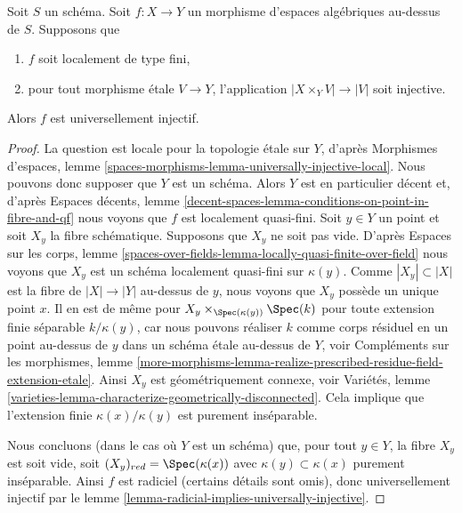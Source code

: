 \begin{lemma}
\label{lemma-check-universally-injective}
Soit $S$ un schéma. Soit $f : X \to Y$ un morphisme d'espaces algébriques
au-dessus de $S$. Supposons que
\begin{enumerate}
\item $f$ soit localement de type fini,
\item pour tout morphisme \'etale $V \to Y$, l'application $|X \times_Y V| \to |V|$
soit injective.
\end{enumerate}
Alors $f$ est universellement injectif.
\end{lemma}

\begin{proof}
La question est locale pour la topologie \'etale sur $Y$, d'après
Morphismes d'espaces, lemme
\ref{spaces-morphisms-lemma-universally-injective-local}.
Nous pouvons donc supposer que $Y$ est un schéma.
Alors $Y$ est en particulier décent et, d'après Espaces décents, lemme
\ref{decent-spaces-lemma-conditions-on-point-in-fibre-and-qf}
nous voyons que $f$ est localement quasi-fini.
Soit $y \in Y$ un point et soit $X_y$ la fibre schématique.
Supposons que $X_y$ ne soit pas vide. D'après Espaces sur les corps, lemme
\ref{spaces-over-fields-lemma-locally-quasi-finite-over-field}
nous voyons que $X_y$ est un schéma localement quasi-fini sur
$\kappa(y)$. Comme $|X_y| \subset |X|$ est la fibre de $|X| \to |Y|$
au-dessus de $y$, nous voyons que $X_y$ possède un unique point $x$. Il en est de même
pour $X_y \times_{\Spec(\kappa(y))} \Spec(k)$ pour toute
extension finie séparable $k/\kappa(y)$,
car nous pouvons réaliser $k$ comme corps résiduel en un point
au-dessus de $y$ dans un schéma \'etale au-dessus de $Y$,
voir Compléments sur les morphismes, lemme
\ref{more-morphisms-lemma-realize-prescribed-residue-field-extension-etale}.
Ainsi $X_y$ est géométriquement connexe, voir
Variétés, lemme \ref{varieties-lemma-characterize-geometrically-disconnected}.
Cela implique que l'extension finie $\kappa(x)/\kappa(y)$
est purement inséparable.

\medskip\noindent
Nous concluons (dans le cas où $Y$ est un schéma)
que, pour tout $y \in Y$, la fibre $X_y$ est soit vide,
soit $(X_y)_{red} = \Spec(\kappa(x))$ avec
$\kappa(y) \subset \kappa(x)$ purement inséparable.
Ainsi $f$ est radiciel (certains détails sont omis), donc universellement injectif par
le lemme \ref{lemma-radicial-implies-universally-injective}.
\end{proof}




